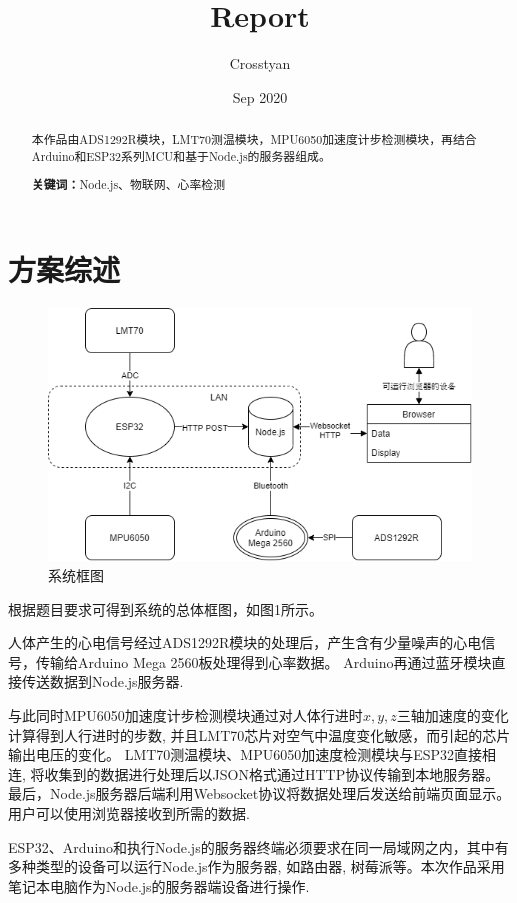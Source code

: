 \documentclass[scheme=chinese,a4paper]{article}
\title{Report}
\author{Crosstyan}
\date{Sep 2020}
\begin{document}
\begin{center}
    \tableofcontents\clearpage
\end{center}

\begin{abstract}
本作品由ADS1292R模块，LMT70测温模块，MPU6050加速度计步检测模块，再结合Arduino和ESP32系列MCU和基于Node.js的服务器组成。

\textbf{关键词：}Node.js、物联网、心率检测
\end{abstract}

\section{方案综述}
\begin{figure}[H]
    \centering
    \includegraphics[width=1\textwidth]{figure.png}
    \caption{系统框图}
\end{figure}
根据题目要求可得到系统的总体框图，如图1所示。\par
人体产生的心电信号经过ADS1292R模块的处理后，产生含有少量噪声的心电信号，传输给Arduino Mega 2560板处理得到心率数据。
Arduino再通过蓝牙模块直接传送数据到Node.js服务器. 

与此同时MPU6050加速度计步检测模块通过对人体行进时$x,y,z$三轴加速度的变化计算得到人行进时的步数, 
并且LMT70芯片对空气中温度变化敏感，而引起的芯片输出电压的变化。
LMT70测温模块、MPU6050加速度检测模块与ESP32直接相连, 将收集到的数据进行处理后以JSON格式通过HTTP协议传输到本地服务器。
最后，Node.js服务器后端利用Websocket协议将数据处理后发送给前端页面显示。用户可以使用浏览器接收到所需的数据. 

ESP32、Arduino和执行Node.js的服务器终端必须要求在同一局域网之内，其中有多种类型的设备可以运行Node.js作为服务器, 如路由器, 树莓派等。本次作品采用笔记本电脑作为Node.js的服务器端设备进行操作. 
\end{document}

